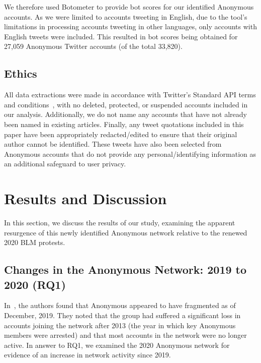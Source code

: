 \documentclass[letterpaper]{article}
\begin{document}
We therefore used Botometer to provide bot scores for our identified Anonymous accounts. As we were limited to accounts tweeting in English, due to the tool's limitations in processing accounts tweeting in other languages, only accounts with English tweets were included. This resulted in bot scores being obtained for 27,059 Anonymous Twitter accounts (of the total 33,820).

\subsection{Ethics}

All data extractions were made in accordance with Twitter's Standard API terms and conditions~\cite{TwitterDev}, with no deleted, protected, or suspended accounts included in our analysis. Additionally, we do not name any accounts that have not already been named in existing articles. Finally, any tweet quotations included in this paper have been appropriately redacted/edited to ensure that their original author cannot be identified. These tweets have also been selected from Anonymous accounts that do not provide any personal/identifying information as an additional safeguard to user privacy.

\section{Results and Discussion}

In this section, we discuss the results of our study, examining the apparent resurgence of this newly identified Anonymous network relative to the renewed 2020 BLM protests. 

\subsection{Changes in the Anonymous Network: 2019 to 2020 (RQ1)}

In~\cite{Jones2020}, the authors found that Anonymous appeared to have fragmented as of December, 2019. They noted that the group had suffered a significant loss in accounts joining the network after 2013 (the year in which key Anonymous members were arrested) and that most accounts in the network were no longer active. In answer to RQ1, we examined the 2020 Anonymous network for evidence of an increase in network activity since 2019.
\end{document}
